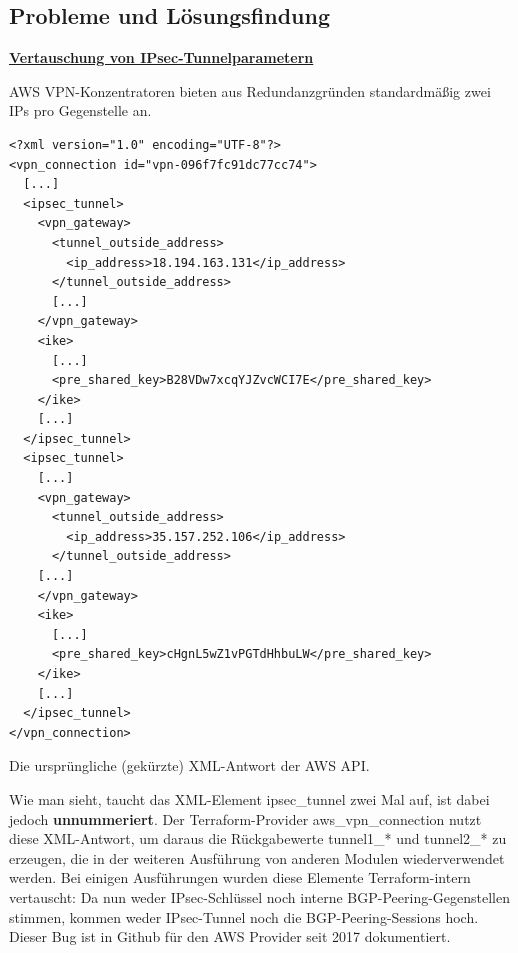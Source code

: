 \subsection{Probleme und Lösungsfindung}

\textbf{\underline{Vertauschung von IPsec-Tunnelparametern}}\label{xml-tunnel-parameters}

AWS VPN-Konzentratoren bieten aus Redundanzgründen standardmäßig zwei IPs pro Gegenstelle an. 
\begin{listing}[h]
\begin{verbatim}
<?xml version="1.0" encoding="UTF-8"?>
<vpn_connection id="vpn-096f7fc91dc77cc74">
  [...]
  <ipsec_tunnel>
    <vpn_gateway>
      <tunnel_outside_address>
        <ip_address>18.194.163.131</ip_address>
      </tunnel_outside_address>
      [...]
    </vpn_gateway>
    <ike>
      [...]
      <pre_shared_key>B28VDw7xcqYJZvcWCI7E</pre_shared_key>
    </ike>
    [...]
  </ipsec_tunnel>
  <ipsec_tunnel>
    [...]
    <vpn_gateway>
      <tunnel_outside_address>
        <ip_address>35.157.252.106</ip_address>
      </tunnel_outside_address>
    [...]
    </vpn_gateway>
    <ike>
      [...]
      <pre_shared_key>cHgnL5wZ1vPGTdHhbuLW</pre_shared_key>
    </ike>
    [...]
  </ipsec_tunnel>
</vpn_connection>

\end{verbatim}
\caption{Die ursprüngliche (gekürzte) XML-Antwort der AWS API.}
\label{tf-xml-response-aws}
\end{listing}
Wie man sieht, taucht das XML-Element ipsec\_tunnel zwei Mal auf, ist dabei jedoch \textbf{unnummeriert}.
Der Terraform-Provider aws\_vpn\_connection nutzt diese XML-Antwort, um daraus die Rückgabewerte tunnel1\_* und tunnel2\_* zu erzeugen\cite{awsattributestf2021}, die in der weiteren Ausführung von anderen Modulen wiederverwendet werden. Bei einigen Ausführungen wurden diese Elemente Terraform-intern vertauscht: Da nun weder IPsec-Schlüssel noch interne BGP-Peering-Gegenstellen stimmen, kommen weder IPsec-Tunnel noch die BGP-Peering-Sessions hoch. Dieser Bug ist in Github für den AWS Provider seit 2017 dokumentiert\cite{githubbugtf2021}.

